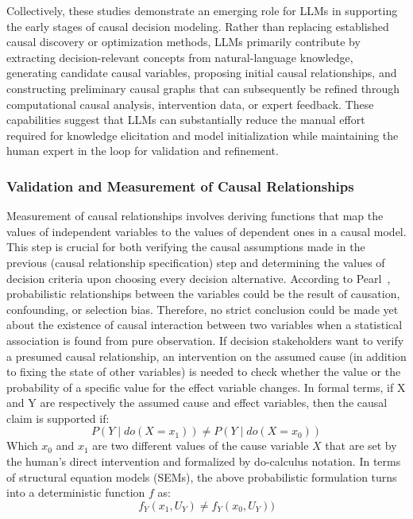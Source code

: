 \documentclass{sfuthesis}
\begin{document}
Collectively, these studies demonstrate an emerging role for LLMs in supporting the early stages of causal decision modeling. Rather than replacing established causal discovery or optimization methods, LLMs primarily contribute by extracting decision-relevant concepts from natural-language knowledge, generating candidate causal variables, proposing initial causal relationships, and constructing preliminary causal graphs that can subsequently be refined through computational causal analysis, intervention data, or expert feedback. These capabilities suggest that LLMs can substantially reduce the manual effort required for knowledge elicitation and model initialization while maintaining the human expert in the loop for validation and refinement.
\subsubsection{Validation and Measurement of Causal Relationships}
Measurement of causal relationships involves deriving functions that map the values of independent variables to the values of dependent ones in a causal model. This step is crucial for both verifying the causal assumptions made in the previous (causal relationship specification) step and determining the values of decision criteria upon choosing every decision alternative. According to Pearl~\cite{pearl_causal_2009}, probabilistic relationships between the variables could be the result of causation, confounding, or selection bias. Therefore, no strict conclusion could be made yet about the existence of causal interaction between two variables when a statistical association is found from pure observation. If decision stakeholders want to verify a presumed causal relationship, an intervention on the assumed cause (in addition to fixing the state of other variables) is needed to check whether the value or the probability of a specific value for the effect variable changes. In formal terms, if X and Y are respectively the assumed cause and effect variables, then the causal claim is supported if:
\begin{equation}
    P(Y\mid do(X=x_1 ) )\neq P(Y\mid do(X=x_0 ))
\end{equation}
Which $x_0$ and $x_1$ are two different values of the cause variable $X$ that are set by the human’s direct intervention and formalized by do-calculus notation. In terms of structural equation models (SEMs), the above probabilistic formulation turns into a deterministic function $f$ as:  
\begin{equation}
    f_Y (x_1,U_Y)\neq f_Y (x_0,U_Y))
\end{equation}
\end{document}
